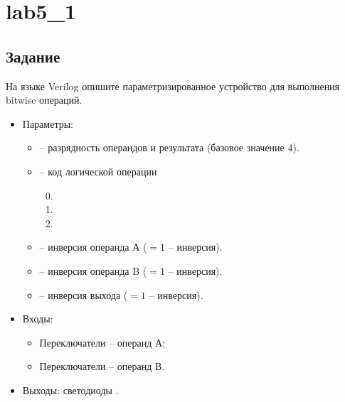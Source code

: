 





\tableofcontents
\newpage
\listoffigures
\lstlistoflistings
\newpage

\section{lab5\_1}

\subsection{Задание}

На языке Verilog опишите параметризированное устройство для выполнения bitwise операций. 
\begin{itemize}
	\item Параметры:
		\begin{itemize}
			\item {} – разрядность операндов и результата (базовое значение 4).
			\item {} -- код логической операции 
				\begin{enumerate}
					\setcounter{enumi}{-1}
					\item \code{&}
					\item \code{|}
					\item \code{^}
				\end{enumerate}
			\item {} -- инверсия операнда А ($=1$ -- инверсия).
			\item {} -- инверсия операнда B ($=1$ -- инверсия).
			\item {} -- инверсия выхода ($=1$ -- инверсия).		
		\end{itemize}
	\item Входы:
		\begin{itemize}
			\item Переключатели  -- операнд А;
			\item Переключатели  -- операнд В.
		\end{itemize}
	\item Выходы: светодиоды .
\end{itemize}

